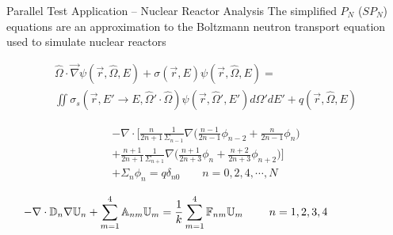 \documentclass{beamer}
\begin{document}
\begin{frame}{Parallel Test Application -- Nuclear Reactor Analysis}
  \small
  The simplified $P_N$ ($SP_N$) equations are an approximation
  to the Boltzmann neutron transport equation used to simulate nuclear
  reactors

  \vspace*{-0.1in}

  \begin{multline}
    \hat{\Omega} \cdot \vec{\nabla} \psi(\vec{r},\hat{\Omega},E) +
    \sigma(\vec{r},E) \psi(\vec{r},\hat{\Omega},E) = \\ \iint
    \sigma_s(\vec{r},E' \rightarrow E,\hat{\Omega}' \cdot \hat{\Omega})
    \psi(\vec{r},\hat{\Omega}',E') d\Omega' dE' +
    q(\vec{r},\hat{\Omega},E)
  \end{multline}

  \begin{multline}
    -\nabla \cdot \Bigg[\frac{n}{2n+1}\frac{1}{\Sigma_{n-1}} \nabla
      \Big(\frac{n-1}{2n-1} \phi_{n-2} + \frac{n}{2n-1}\phi_n \Big) \\+
      \frac{n+1}{2n+1}\frac{1}{\Sigma_{n+1}} \nabla
      \Big(\frac{n+1}{2n+3}\phi_n + \frac{n+2}{2n+3}\phi_{n+2}\Big)
      \Bigg] \\+ \Sigma_n \phi_n = q \delta_{n0}\ \ \ \ \ \ \ \ \ n =
    0,2,4,\cdots,N
  \end{multline}

  \begin{equation}
  \hspace*{-0.75in}
    -\nabla \cdot \mathbb{D}_n \nabla \mathbb{U}_n + \sum_{m=1}^4
    \mathbb{A}_{nm} \mathbb{U}_m = \frac{1}{k} \sum_{m=1}^4
    \mathbb{F}_{nm} \mathbb{U}_m\ \ \ \ \ \ \ n = 1,2,3,4
  \end{equation}

\end{frame}
\end{document}
